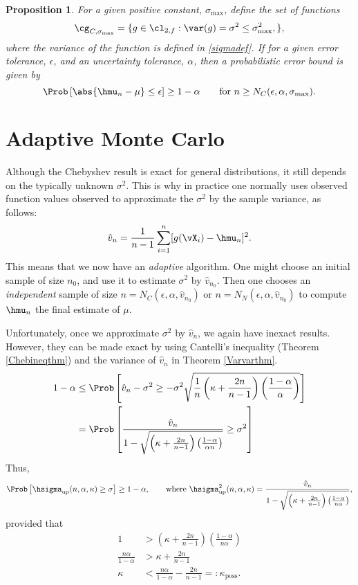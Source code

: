 \documentclass[12pt]{amsart}
\newcommand{\hv}{\hat{v}}
\newtheorem{prop}[theorem]{Proposition}
\begin{document}
\begin{prop}  For a given positive constant, $\sigma_{\max}$, define the set of functions 
\[
\cg_{C,\sigma_{\max}}= \{g \in \cl_{2,f} : \var(g)= \sigma^2 \le \sigma^2_{\max}, \},
\]
where the variance of the function is defined in \eqref{sigmadef}.  If for a given error tolerance, $\epsilon$, and an uncertainty tolerance, $\alpha$, then a probabilistic error bound is given by 
\[
\Prob\left[\abs{\hmu_n-\mu} \le \epsilon \right] \ge 1-\alpha \qquad \text{for } n\ge N_{C}(\epsilon,\alpha,\sigma_{\max}).
\]
\end{prop}

\section{Adaptive Monte Carlo}
Although the Chebyshev result is exact for general distributions, it still depends on the typically unknown $\sigma^2$.  This is why in practice one normally uses observed function values observed to approximate the $\sigma^2$ by the sample variance, as follows:
\begin{equation} \label{samplevar}
\hv_{n} = \frac 1{n-1} \sum_{i=1}^{n} [g(\vX_i)- \hmu_{n}]^2.
\end{equation}
This means that we now have an \emph{adaptive} algorithm.  One might choose an initial sample of size $n_0$, and use it to estimate $\sigma^2$ by $\hv_{n_0}$.  Then one chooses an \emph{independent} sample of size $n=N_{C}(\epsilon,\alpha,\hv_{n_0})$ or $n=N_{N}(\epsilon,\alpha,\hv_{n_0})$ to compute $\hmu_n$ the final estimate of $\mu$.

Unfortunately, once we approximate $\sigma^2$ by $\hv_n$, we again have inexact results.  However, they can be made exact by using Cantelli's inequality (Theorem \ref{Chebineqthm}) and the variance of $\hv_n$ in Theorem \ref{Varvarthm}.
\begin{align*}
1-\alpha & \le \Prob\left[\hv_n-\sigma^2 \ge - \sigma^2 \sqrt{\frac 1n \left ( \kappa  + \frac{2n}{n-1}\right)\left(\frac{1-\alpha}{\alpha}\right)} \right] \\
&= \Prob\left[\frac{\hv_n}{1 - \sqrt{\left ( \kappa  + \frac{2n}{n-1}\right)\left(\frac{1-\alpha}{\alpha n}\right)}} \ge \sigma^2 \right]
\end{align*}
Thus,
\begin{equation} \label{probvarupbd}
\Prob\left[\hsigma_{\text{up}}(n,\alpha,\kappa)  \ge \sigma \right] \ge 1 - \alpha, \qquad \text{where } \hsigma^2_{\text{up}}(n,\alpha,\kappa) = \frac{\hv_{n}}{1 - \sqrt{ \left ( \kappa  + \frac{2n}{n-1}\right)\left(\frac{1-\alpha}{n \alpha}\right)}},
\end{equation}
provided that 
\begin{align*}
1 &> \left ( \kappa  + \frac{2n}{n-1}\right)\left(\frac{1-\alpha}{n \alpha}\right)\\
\frac{n \alpha}{1-\alpha} & > \kappa  + \frac{2n}{n-1} \\
\kappa & < \frac{n \alpha}{1-\alpha} - \frac{2n}{n-1} =: \kappa_{\text{poss}}.
\end{align*}
\end{document}
